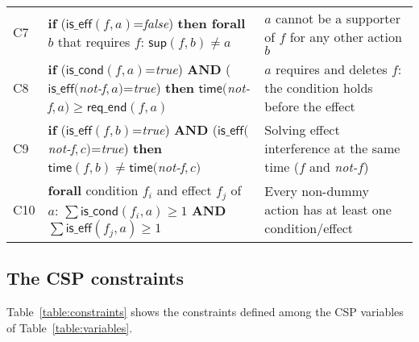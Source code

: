 \documentclass{ecai}
\newcommand{\iscond}{\mathsf{is\_cond}}    %
\newcommand{\iseff}{\mathsf{is\_eff}}    %
\newcommand{\supp}{\mathsf{sup}}   %
\newcommand{\tim}{\mathsf{time}}   %
\newcommand{\reqe}{\mathsf{req\_{end}}}   %
\begin{document}
\begin{table*}
\begin{center}
\begin{scriptsize}
\begin{tabular}{p{0.1cm}p{10.2cm}p{6.4cm}}
C7& \textbf{if} ($\iseff(f,a)$=\textit{false}) \textbf{then forall} $b$ that requires $f$: $\supp(f,b) \neq a$ & $a$ cannot be a supporter of $f$ for any other action $b$\\

C8& \textbf{if} ($\iscond(f,a)$=\textit{true}) \textbf{AND} ($\iseff($\textit{not-f}$,a)$=\textit{true}) \textbf{then} $\tim($\textit{not-f}$,a) \geq \reqe(f,a)$ & $a$ requires and deletes $f$: the condition holds before the effect \\ 

C9& \textbf{if} ($\iseff(f,b)$=\textit{true}) \textbf{AND} ($\iseff($\textit{not-f}$,c)$=\textit{true}) \textbf{then} $\tim(f,b) \neq \tim($\textit{not-f}$,c)$ & Solving effect interference at the same time ($f$ and \textit{not-}$f$) \\

C10& \textbf{forall} condition $f_i$ and effect $f_j$ of $a$: $\sum \iscond(f_i,a) \geq 1$ \textbf{AND} $\sum \iseff(f_j,a) \geq 1$ & Every non-dummy action has at least one condition/effect \\

\end{tabular}
\end{scriptsize}	
\label{table:constraints}
\end{center}	
\end{table*}

\subsection{The CSP constraints}
\label{section:CSPconstraints}
Table~\ref{table:constraints} shows the constraints defined among the CSP variables of Table~\ref{table:variables}. 
\end{document}
